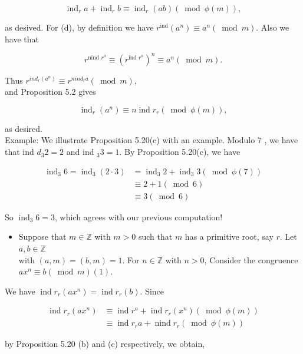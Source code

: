 \documentclass[10pt]{article}
\begin{document}
$$
\operatorname{ind}_{r} a+\operatorname{ind}_{r} b \equiv \operatorname{ind}_{r}(a b)(\bmod \phi(m)),
$$

as desived. For (d), by definition we have $r^{\operatorname{ind}}\left(a^{n}\right) \equiv a^{n}(\bmod m)$. Also we have that

$$
r^{\text {nind } r^{a}} \equiv\left(r^{\text {ind } r^{a}}\right)^{n} \equiv a^{n}(\bmod m) .
$$

Thus $r^{i n d_{r}\left(a^{n}\right)} \equiv r^{n i n d_{r} a}(\bmod m)$,\\
and Proposition 5.2 gives

$$
\operatorname{ind}_{r}\left(a^{n}\right) \equiv n \operatorname{ind} r_{r}(\bmod \phi(m)),
$$

as desired.\\
Example: We illustrate Proposition 5.20(c) with an example. Modulo 7 , we have that ind $d_{3} 2=2$ and ind $_{3} 3=1$. By Proposition 5.20(c), we have

$$
\begin{aligned}
\operatorname{ind}_{3} 6=\operatorname{ind}_{3}(2 \cdot 3) & =\operatorname{ind}_{3} 2+\operatorname{ind}_{3} 3(\bmod \phi(7)) \\
& \equiv 2+1(\bmod 6) \\
& \equiv 3(\bmod 6)
\end{aligned}
$$

So $\operatorname{ind}_{3} 6=3$, which agrees with our previous computation!

\begin{itemize}
  \item Suppose that $m \in \mathbb{Z}$ with $m>0$ such that $m$ has a primitive root, say $r$. Let $a, b \in \mathbb{Z}$\\
with $(a, m)=(b, m)=1$. For $n \in \mathbb{Z}$ with $n>0$, Consider the congruence $a x^{n} \equiv b(\bmod m)(1)$.
\end{itemize}

We have $\operatorname{ind} r_{r}\left(a x^{n}\right)=\operatorname{ind} r_{r}(b)$. Since

$$
\begin{aligned}
\operatorname{ind} r_{r}\left(a x^{n}\right) & \equiv \operatorname{ind} r^{a}+\operatorname{ind} r_{r}\left(x^{n}\right)(\bmod \phi(m)) \\
& \equiv \operatorname{ind} r_{r} a+\operatorname{nind} r_{r}(\bmod \phi(m))
\end{aligned}
$$

by Proposition 5.20 (b) and (c) respectively, we obtain,
\end{document}
